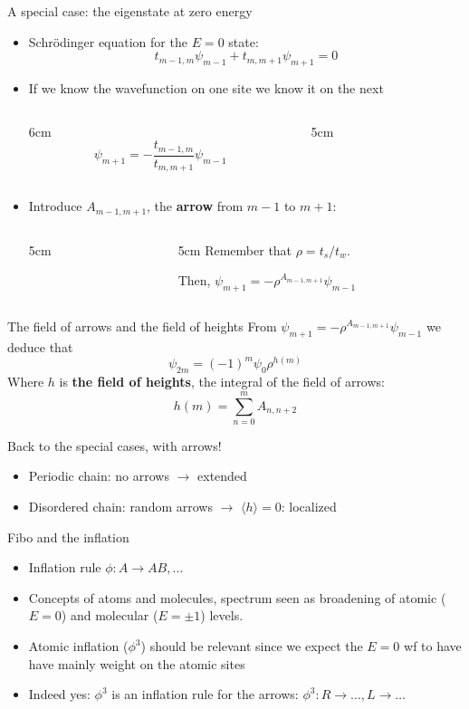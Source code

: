 \documentclass[xcolor=x11names,compress,professionalfonts]{beamer}
\renewcommand{\(}{\begin{columns}}
\renewcommand{\)}{\end{columns}}
\newcommand{\<}[1]{\begin{column}{#1}}
\renewcommand{\>}{\end{column}}
\begin{document}
\begin{frame}{A special case: the eigenstate at zero energy}
\begin{itemize}
	\item Schrödinger equation for the $E=0$ state:
	\[
	t_{m-1,m} \psi_{m-1} + t_{m,m+1}\psi_{m+1} = 0
	\]
	\item If we know the wavefunction on one site we know it on the next
	\begin{columns}
	\<{6cm}
	\[
	\psi_{m+1} = -\frac{t_{m-1,m}}{t_{m,m+1}} \psi_{m-1}
	\]
	\>
	\<{5cm}
	
	\>
	\end{columns}
	\item Introduce $A_{m-1,m+1}$, the \textbf{arrow} from $m-1$ to $m+1$:
	\begin{columns}
	\<{5cm}
	\centering
	 
	 \>
	 \<{5cm}
	 Remember that $\rho = t_s/t_w$.
	 
	Then, $\boxed{\psi_{m+1} =- \rho^{A_{m-1,m+1}} \psi_{m-1}}$
	 \>
	 \end{columns}
\end{itemize}
\end{frame}

\begin{frame}{The field of arrows and the field of heights}
From $\psi_{m+1} =- \rho^{A_{m-1,m+1}} \psi_{m-1}$ we deduce that
\[
	\psi_{2m} = (-1)^{m} \psi_0 \rho^{h(m)}
\]
Where $h$ is \textbf{the field of heights}, the integral of the field of arrows:
\[
	h(m) = \sum_{n=0}^m A_{n, n+2}
\]



\end{frame}

\begin{frame}{Back to the special cases, with arrows!}
\begin{itemize}
	\item Periodic chain: no arrows $\rightarrow$ extended
	\item Disordered chain: random arrows $\rightarrow$ $\langle h \rangle = 0$: localized
\end{itemize}
\end{frame}

\begin{frame}{Fibo and the inflation}
\begin{itemize}
	\item Inflation rule $\phi: A \to AB,\dots$
	\item Concepts of atoms and molecules, spectrum seen as broadening of atomic ($E=0$) and molecular ($E = \pm 1$) levels.
	\item Atomic inflation ($\phi^3$) should be relevant since we expect the $E=0$ wf to have have mainly weight on the atomic sites
	\item Indeed yes: $\phi^3$ is an inflation rule for the arrows: $\phi^3: R \to \dots, L \to \dots$
\end{itemize}
\end{frame}
\end{document}
